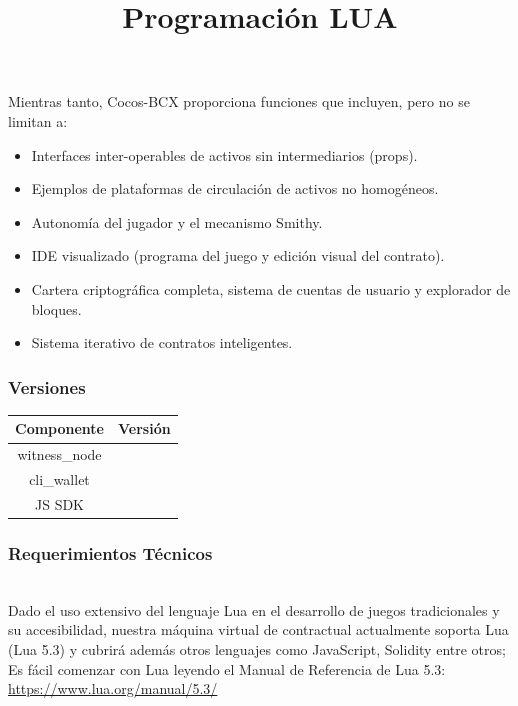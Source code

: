 \documentclass{article}
\begin{document}
Mientras tanto, Cocos-BCX proporciona funciones que incluyen, pero no se limitan a:
\begin{itemize}
    \item Interfaces inter-operables de activos sin intermediarios (props).
    \item Ejemplos de plataformas de circulación de activos no homogéneos.
    \item Autonomía del jugador y el mecanismo Smithy.
    \item IDE visualizado (programa del juego y edición visual del contrato).
    \item Cartera criptográfica completa, sistema de cuentas de usuario y explorador de bloques.
    \item Sistema iterativo de contratos inteligentes.
\end{itemize}

\subsubsection{Versiones}

\begin{table}[h!]
\centering
\begin{tabular}{||c   c ||} 
 \hline
 Componente & Versión \\
 \hline\hline
 witness\_node &   \\ 
 \hline
 cli\_wallet &   \\ 
 \hline
 JS SDK &   \\ 
 \hline\hline
\end{tabular}
\end{table}

\subsubsection{Requerimientos Técnicos}
\title{Programación LUA}\\
Dado el uso extensivo del lenguaje Lua en el desarrollo de juegos tradicionales y su accesibilidad, nuestra máquina virtual de contractual actualmente soporta Lua (Lua 5.3) y cubrirá además otros lenguajes como JavaScript, Solidity entre otros; Es fácil comenzar con Lua leyendo el Manual de Referencia de Lua 5.3: \url{https://www.lua.org/manual/5.3/}
\end{document}
